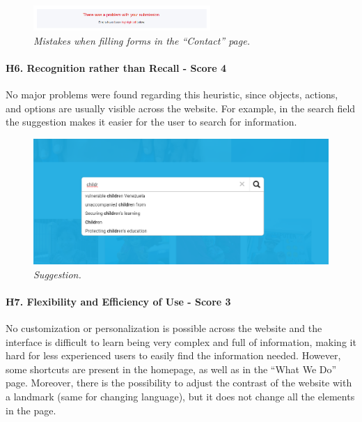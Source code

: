 \begin{figure}[h]
	\centering
	\begin{center}
		\includegraphics[width=0.6\textwidth]{Picture10.png}
	\end{center}
	\captionsetup{font=small}
	\caption{\textit{Mistakes when filling forms in the “Contact” page.}}
	\label{fig:label10}
\end{figure}

\paragraph*{H6. Recognition rather than Recall - Score 4}
No major problems were found regarding this heuristic, since objects, actions, and options are usually visible across the website. For example, in the search field the suggestion makes it easier for the user to search for information.

\begin{figure}[h]
	\centering
	\begin{center}
		\includegraphics[width=\textwidth]{Picture11.png}
	\end{center}
	\captionsetup{font=small}
	\caption{\textit{Suggestion.}}
	\label{fig:label11}
\end{figure}

\paragraph*{H7. Flexibility and Efficiency of Use - Score 3}
No customization or personalization is possible across the website and the interface is difficult to learn being very complex and full of information, making it hard for less experienced users to easily find the information needed. However, some shortcuts are present in the homepage, as well as in the “What We Do” page. Moreover, there is the possibility to adjust the contrast of the website with a landmark (same for changing language), but it does not change all the elements in the page.

